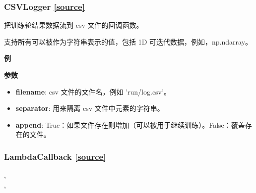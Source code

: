 \subsubsection{CSVLogger {\href{https://github.com/keras-team/keras/blob/master/keras/callbacks.py\#L927}{{[}source{]}}}}

\begin{Shaded}
\begin{Highlighting}[]
\OperatorTok{=}\OperatorTok{=}\NormalTok{)}
\end{Highlighting}
\end{Shaded}

把训练轮结果数据流到 csv 文件的回调函数。

支持所有可以被作为字符串表示的值，包括 1D 可迭代数据，例如，np.ndarray。

\textbf{例}

\begin{Shaded}
\begin{Highlighting}[]
\OperatorTok{=} \NormalTok{)}
\OperatorTok{=}
\end{Highlighting}
\end{Shaded}

\textbf{参数}

\begin{itemize}
\tightlist
\item
  \textbf{filename}: csv 文件的文件名，例如 'run/log.csv'。
\item
  \textbf{separator}: 用来隔离 csv 文件中元素的字符串。
\item
  \textbf{append}:
  True：如果文件存在则增加（可以被用于继续训练）。False：覆盖存在的文件。
\end{itemize}



\subsubsection{LambdaCallback {\href{https://github.com/keras-team/keras/blob/master/keras/callbacks.py\#L1004}{{[}source{]}}}
}

\begin{Shaded}
\begin{Highlighting}[]
\OperatorTok{=}\OperatorTok{=}, \\
\hspace{3cm}\OperatorTok{=}\OperatorTok{=}, \\
\hspace{3cm}\OperatorTok{=}\OperatorTok{=}\NormalTok{)}
\end{Highlighting}
\end{Shaded}

